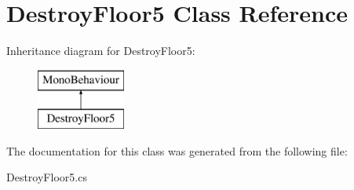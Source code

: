 \hypertarget{class_destroy_floor5}{}\section{Destroy\+Floor5 Class Reference}
\label{class_destroy_floor5}
Inheritance diagram for Destroy\+Floor5\+:\begin{figure}[H]
\begin{center}
\leavevmode
\includegraphics[height=2.000000cm]{class_destroy_floor5}
\end{center}
\end{figure}


The documentation for this class was generated from the following file\+:\begin{DoxyCompactItemize}
\item 
Destroy\+Floor5.\+cs\end{DoxyCompactItemize}
